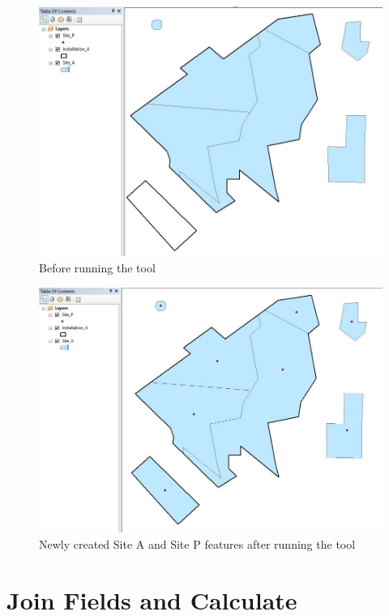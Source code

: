 \documentclass[openany]{book}
\theoremstyle{definition}
\theoremstyle{definition}
\theoremstyle{definition}
\theoremstyle{remark}
\begin{document}
\begin{figure}[H]

{\centering \includegraphics{figures/csd-before} 

}

\caption{Before running the tool}\label{fig:csdbefore}
\end{figure}\begin{figure}[H]

{\centering \includegraphics{figures/csd-after} 

}

\caption{Newly created Site A and Site P features after running the tool}\label{fig:csdafter}
\end{figure}

\hypertarget{joinCalc}{\chapter{Join Fields and
Calculate}\label{joinCalc}}
\end{document}
